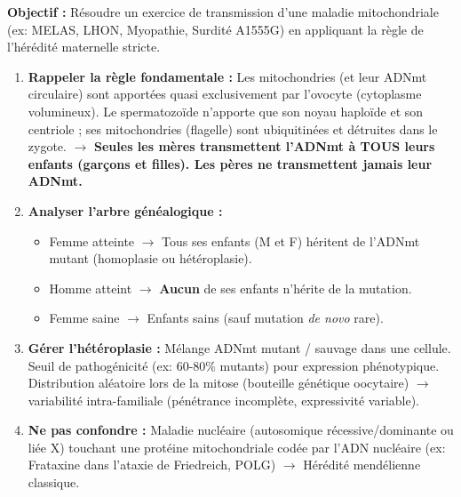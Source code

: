 \documentclass[11pt]{article}
\begin{document}
\begin{methode}
    \textbf{Objectif :} Résoudre un exercice de transmission d'une maladie mitochondriale (ex: MELAS, LHON, Myopathie, Surdité A1555G) en appliquant la règle de l'hérédité maternelle stricte.
    \begin{enumerate}
        \item \textbf{Rappeler la règle fondamentale :} Les mitochondries (et leur ADNmt circulaire) sont apportées quasi exclusivement par l'ovocyte (cytoplasme volumineux). Le spermatozoïde n'apporte que son noyau haploïde et son centriole ; ses mitochondries (flagelle) sont ubiquitinées et détruites dans le zygote. $\to$ \textbf{Seules les mères transmettent l'ADNmt à TOUS leurs enfants (garçons et filles). Les pères ne transmettent jamais leur ADNmt.}
        \item \textbf{Analyser l'arbre généalogique :}
              \begin{itemize}
                  \item Femme atteinte $\to$ Tous ses enfants (M et F) héritent de l'ADNmt mutant (homoplasie ou hétéroplasie).
                  \item Homme atteint $\to$ \textbf{Aucun} de ses enfants n'hérite de la mutation.
                  \item Femme saine $\to$ Enfants sains (sauf mutation \emph{de novo} rare).
              \end{itemize}
        \item \textbf{Gérer l'hétéroplasie :} Mélange ADNmt mutant / sauvage dans une cellule. Seuil de pathogénicité (ex: 60-80\% mutants) pour expression phénotypique. Distribution aléatoire lors de la mitose (bouteille génétique oocytaire) $\to$ variabilité intra-familiale (pénétrance incomplète, expressivité variable).
        \item \textbf{Ne pas confondre :} Maladie nucléaire (autosomique récessive/dominante ou liée X) touchant une protéine mitochondriale codée par l'ADN nucléaire (ex: Frataxine dans l'ataxie de Friedreich, POLG) $\to$ Hérédité mendélienne classique.
    \end{enumerate}
\end{methode}
\end{document}
